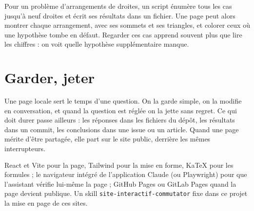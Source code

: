 \begin{exemple}
Pour un problème d'arrangements de droites, un script énumère tous les cas jusqu'à neuf
droites et écrit ses résultats dans un fichier. Une page peut alors montrer chaque
arrangement, avec ses sommets et ses triangles, et colorer ceux où une hypothèse tombe en
défaut. Regarder ces cas apprend souvent plus que lire les chiffres : on voit quelle
hypothèse supplémentaire manque.
\end{exemple}

\section{Garder, jeter}

Une page locale sert le temps d'une question. On la garde simple, on la modifie en
conversation, et quand la question est réglée on la jette sans regret.
Ce qui doit durer passe ailleurs : les réponses dans les fichiers du dépôt, les résultats
dans un commit, les conclusions dans une issue ou un article. Quand une page mérite d'être
partagée, elle part sur le site public, derrière les mêmes interrupteurs.

\begin{outils}
React et Vite pour la page, Tailwind pour la mise en forme, KaTeX pour les formules ;
le navigateur intégré de l'application Claude (ou Playwright) pour que l'assistant vérifie
lui-même la page ; GitHub Pages ou GitLab Pages quand la page devient publique. Un skill
\texttt{site-interactif-commutator} fixe dans ce projet la mise en page de ces sites.
\end{outils}
